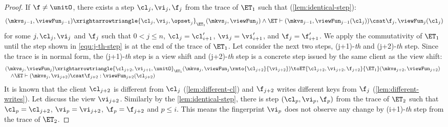 \begin{proof}
If \( \f \neq \unitO \), there exists a step \( \cl_j, \vi_j, \f_j \) from the trace of \( \ET_1 \) such that (\cref{lem:identical-step}):
\begin{equation}
    \label{equ:j-th-step}
    (\mkvs_{j-1}, \viewFun_{j-1}) \xrightarrowtriangle{\cl_{j}, \vi_{j}, \opset_{j}}_{\ET_1} (\mkvs_j, \viewFun_j) \land \ET \vdash (\mkvs_{j-1}, \viewFun_{j-1}(\cl_j)) \csat \f_j, \viewFun_j(\cl_j)
\end{equation}
for some \( j, \cl_j, \vi_j\) and \( \f_j \) such that \( 0 <  j \leq n \), \( \cl_j = \cl'_{i+1}\), \( \vi_j = \vi'_{i+1}\), and \( \f_j = \f'_{i+1}\).
We apply the commutativity of \( \ET_1 \) until the step shown in \cref{equ:j-th-step} is at the end of the trace of \( \ET_1 \).
Let consider the next two steps, (j+1)-\emph{th} and (j+2)-\emph{th} step.
Since the trace is in normal form, the (j+1)-\emph{th} step is a view shift and (j+2)-\emph{th} step is a concrete step issued by the same client as the view shift:
\begin{equation}
    \label{equ:j-plus-1-th-step}
    \begin{array}{@{}l}
        (\mkvs_j, \viewFun_j) \xrightarrowtriangle{\cl_{j+2}, \vi_{j+1}, \unitO}_{\ET_1} (\mkvs_{j}, \viewFun_{j}\rmto{\cl_{j+2}}{\vi_{j+2}}) \toET{\cl_{j+2}, \vi_{j+2}, \f_{j+2}}{\ET_1} (\mkvs_{j+2}, \viewFun_{j+2}) \\
    \quad \land \ET \vdash (\mkvs_j,\vi_{j+2}) \csat \f_{j+2} : \viewFun_{j+2}(\cl_{j+2}) 
    \end{array}
\end{equation}
It is known that the client  \( \cl_{j+2} \) is different from \( \cl_j \) (\cref{lem:different-cl}) and \( \f_{j+2} \) writes different keys from \( \f_j\) (\cref{lem:different-writes}). 
Let discuss the view \( \vi_{j+2} \).
Similarly by the \cref{lem:identical-step}, there is step \((\cl_p, \vi_p, \f_p)\) from the trace of \( \ET_2 \) such that \( \cl_p = \cl_{j+2}\), \( \vi_p = \vi_{j+2} \), \( \f_p = \f_{j+2}\) and \( p \leq i \).
This means the fingerprint \( \vi_p \) does not observe any change by (i+1)-\emph{th} step from the trace of \( \ET_2\).

\end{proof}
